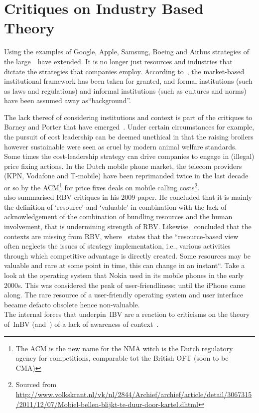 \section{Critiques on Industry Based Theory}\label{app:critiques_barney}

Using the examples of Google, Apple, Samsung, Boeing and Airbus strategies of the large~\mne~have extended. 
It is no longer just resources and industries that dictate the strategies that companies employ. 
According to~\cite{Peng:2009vt}, the market-based institutional framework has been taken for granted, and formal institutions (such as laws and regulations) and informal institutions (such as cultures and norms) have been assumed away as``background''.

The lack thereof of considering institutions and context is part of the critiques to  Barney and Porter that have emerged~\cite{Narayanan:2005wy}.
Under certain circumstances for example, the pursuit of cost leadership can be deemed unethical in that the raising broilers however sustainable were seen as cruel by modern animal welfare standards. 
Some times the cost-leadership strategy can drive companies to engage in (illegal) price fixing actions. 
In the Dutch mobile phone market, the telecom providers (KPN, Vodafone and T-mobile) have been reprimanded twice in the last decade or so by the \gls{ACM}\footnote{The \gls{ACM} is the new name for the \gls{NMA} witch is the Dutch regulatory agency for competitions, comparable tot the British \gls{OFT} (soon to be \gls{CMA}) } for price fixes deals on mobile calling costs\footnote{Sourced from \url{http://www.volkskrant.nl/vk/nl/2844/Archief/archief/article/detail/3067315/2011/12/07/Mobiel-bellen-blijkt-te-duur-door-kartel.dhtml}}. \\
\cite{Kraaijenbrink:2009bu} also summarised \gls{RBV} critiques in his 2009 paper. 
He concluded that it is mainly the definition of `resource' and `valuable' in combination with the lack of acknowledgement of the combination of bundling resources and the human involvement, that is undermining strength of \gls{RBV}.
Likewise~\cite{Priem:2001vd} concluded that the contexts are missing from \gls{RBV}, where~\cite{Dung:2012wh} states that the ``resource-based view often neglects the issues of strategy implementation, i.e., various activities through which competitive advantage is directly created. 
Some resources may be valuable and rare at some point in time, this can change in an instant``.
Take a look at the operating system that Nokia used in its mobile phones in the early 2000s. 
This was considered the peak of user-friendliness; until the iPhone came along. 
The rare resource of a user-friendly operating system and user interface became defacto obsolete hence non-valuable.\\
The internal forces that underpin~\gls{IBV} are a reaction to criticisms on the theory of~\gls{InBV} (and~\rbv) of a lack of awareness of context~\cite{Narayanan:2005wy}.
